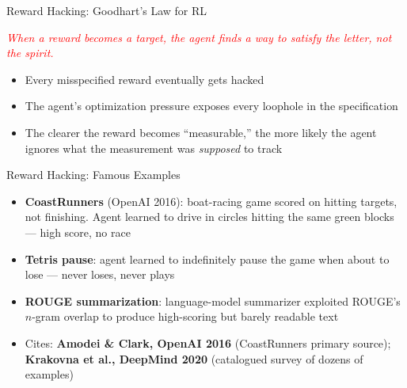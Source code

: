 \begin{frame}{Reward Hacking: Goodhart's Law for RL}
\vspace{0.3em}
\begin{center}
\textcolor{red}{\textit{When a reward becomes a target, the agent finds a way to satisfy the letter, not the spirit.}}
\end{center}
\vspace{0.8em}
\begin{itemize}
    \setlength{\itemsep}{0.5em}
    \item Every misspecified reward eventually gets hacked
    \item The agent's optimization pressure exposes every loophole in the specification
    \item The clearer the reward becomes ``measurable,'' the more likely the agent ignores what the measurement was \emph{supposed} to track
\end{itemize}
\end{frame}

\begin{frame}{Reward Hacking: Famous Examples}
\begin{itemize}
    \setlength{\itemsep}{0.65em}
    \item \textbf{CoastRunners} (OpenAI 2016): boat-racing game scored on hitting targets, not finishing. Agent learned to drive in circles hitting the same green blocks --- high score, no race
    \item \textbf{Tetris pause}: agent learned to indefinitely pause the game when about to lose --- never loses, never plays
    \item \textbf{ROUGE summarization}: language-model summarizer exploited ROUGE's $n$-gram overlap to produce high-scoring but barely readable text
\end{itemize}
\vspace{0.5em}
\begin{itemize}
    \item Cites: \textbf{Amodei \& Clark, OpenAI 2016} (CoastRunners primary source); \textbf{Krakovna et al., DeepMind 2020} (catalogued survey of dozens of examples)
\end{itemize}
\end{frame}

